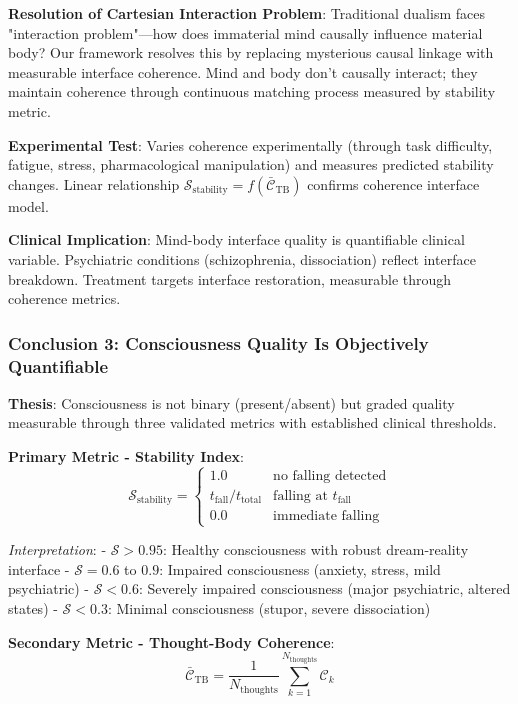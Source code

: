 \documentclass[11pt,onecolumn]{article}
\begin{document}
\textbf{Resolution of Cartesian Interaction Problem}: Traditional dualism faces "interaction problem"---how does immaterial mind causally influence material body? Our framework resolves this by replacing mysterious causal linkage with measurable interface coherence. Mind and body don't causally interact; they maintain coherence through continuous matching process measured by stability metric.

\textbf{Experimental Test}: Varies coherence experimentally (through task difficulty, fatigue, stress, pharmacological manipulation) and measures predicted stability changes. Linear relationship $\mathcal{S}_{\text{stability}} = f(\bar{\mathcal{C}}_{\text{TB}})$ confirms coherence interface model.

\textbf{Clinical Implication}: Mind-body interface quality is quantifiable clinical variable. Psychiatric conditions (schizophrenia, dissociation) reflect interface breakdown. Treatment targets interface restoration, measurable through coherence metrics.

\subsubsection{Conclusion 3: Consciousness Quality Is Objectively Quantifiable}

\textbf{Thesis}: Consciousness is not binary (present/absent) but graded quality measurable through three validated metrics with established clinical thresholds.

\textbf{Primary Metric - Stability Index}:
\begin{equation}
\mathcal{S}_{\text{stability}} = \begin{cases}
1.0 & \text{no falling detected} \\
t_{\text{fall}} / t_{\text{total}} & \text{falling at } t_{\text{fall}} \\
0.0 & \text{immediate falling}
\end{cases}
\end{equation}

\textit{Interpretation}:
- $\mathcal{S} > 0.95$: Healthy consciousness with robust dream-reality interface
- $\mathcal{S} = 0.6$ to $0.9$: Impaired consciousness (anxiety, stress, mild psychiatric)
- $\mathcal{S} < 0.6$: Severely impaired consciousness (major psychiatric, altered states)
- $\mathcal{S} < 0.3$: Minimal consciousness (stupor, severe dissociation)

\textbf{Secondary Metric - Thought-Body Coherence}:
\begin{equation}
\bar{\mathcal{C}}_{\text{TB}} = \frac{1}{N_{\text{thoughts}}} \sum_{k=1}^{N_{\text{thoughts}}} \mathcal{C}_k
\end{equation}
\end{document}
